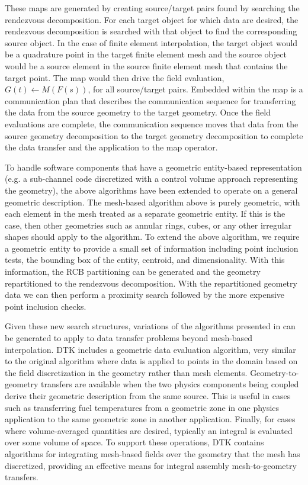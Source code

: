 \documentclass{mc2013}
\begin{document}
These maps are generated by creating source/target pairs found by
searching the rendezvous decomposition. For each target object for
which data are desired, the rendezvous decomposition is searched with
that object to find the corresponding source object. In the case of
finite element interpolation, the target object would be a quadrature
point in the target finite element mesh and the source object would be
a source element in the source finite element mesh that contains the
target point. The map would then drive the field evaluation,
$G(t)\leftarrow M(F(s))$, for all source/target pairs. Embedded within
the map is a communication plan that describes the communication
sequence for transferring the data from the source geometry to the
target geometry. Once the field evaluations are complete, the
communication sequence moves that data from the source geometry
decomposition to the target geometry decomposition to complete the
data transfer and the application to the map operator.

\label{subsec:general_geometry}

To handle software components that have a geometric entity-based
representation (e.g. a sub-channel code discretized with a control
volume approach representing the geometry), the above algorithms have
been extended to operate on a general geometric description. The
mesh-based algorithm above is purely geometric, with each element in
the mesh treated as a separate geometric entity. If this is the case,
then other geometries such as annular rings, cubes, or any other
irregular shapes should apply to the algorithm. To extend the above
algorithm, we require a geometric entity to provide a small set of
information including point inclusion tests, the bounding box of the
entity, centroid, and dimensionality. With this information, the RCB
partitioning can be generated and the geometry repartitioned to the
rendezvous decomposition. With the repartitioned geometry data we can
then perform a proximity search followed by the more expensive point
inclusion checks.

Given these new search structures, variations of the algorithms
presented in \cite{Plimpton_2004} can be generated to apply to data
transfer problems beyond mesh-based interpolation. DTK includes a
geometric data evaluation algorithm, very similar to the original
algorithm where data is applied to points in the domain based on the
field discretization in the geometry rather than mesh
elements. Geometry-to-geometry transfers are available when the two
physics components being coupled derive their geometric description
from the same source. This is useful in cases such as transferring
fuel temperatures from a geometric zone in one physics application to
the same geometric zone in another application. Finally, for cases
where volume-averaged quantities are desired, typically an integral is
evaluated over some volume of space. To support these operations, DTK
contains algorithms for integrating mesh-based fields over the
geometry that the mesh has discretized, providing an effective means
for integral assembly mesh-to-geometry transfers.
\end{document}
